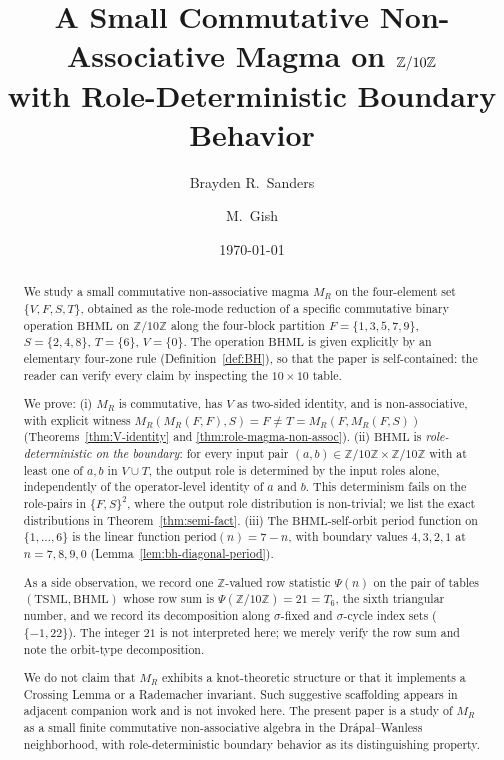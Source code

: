 \documentclass[11pt,reqno]{amsart}
\title[A small role-deterministic magma on $\Zten$]
{A Small Commutative Non-Associative Magma on $\Zten$\\
 with Role-Deterministic Boundary Behavior}
\author{Brayden R.\ Sanders}
\author{M.\ Gish}
\date{\today}
\theoremstyle{plain}
\theoremstyle{definition}
\theoremstyle{remark}
\newcommand{\Z}{\mathbb{Z}}
\newcommand{\TS}{\mathrm{TSML}}
\newcommand{\BH}{\mathrm{BHML}}
\newcommand{\sig}{\sigma}
\newcommand{\Zten}{\Z/10\Z}
\begin{document}
\begin{abstract}
We study a small commutative non-associative magma $M_R$ on the
four-element set $\{V, F, S, T\}$, obtained as the role-mode
reduction of a specific commutative binary operation $\BH$ on
$\Zten$ along the four-block partition
$F = \{1, 3, 5, 7, 9\}$, $S = \{2, 4, 8\}$, $T = \{6\}$,
$V = \{0\}$. The operation $\BH$ is given explicitly by an
elementary four-zone rule (Definition~\ref{def:BH}), so that the
paper is self-contained: the reader can verify every claim by
inspecting the $10 \times 10$ table.

We prove: (i) $M_R$ is commutative, has $V$ as two-sided identity,
and is non-associative, with explicit witness
$M_R(M_R(F, F), S) = F \neq T = M_R(F, M_R(F, S))$
(Theorems~\ref{thm:V-identity} and \ref{thm:role-magma-non-assoc}).
(ii) $\BH$ is \emph{role-deterministic on the boundary}: for every
input pair $(a, b) \in \Zten \times \Zten$ with at least one of
$a, b$ in $V \cup T$, the output role is determined by the input
roles alone, independently of the operator-level identity of $a$
and $b$. This determinism fails on the role-pairs in $\{F, S\}^2$,
where the output role distribution is non-trivial; we list the
exact distributions in Theorem~\ref{thm:semi-fact}. (iii) The
$\BH$-self-orbit period function on $\{1, \ldots, 6\}$ is the
linear function $\mathrm{period}(n) = 7 - n$, with boundary
values $4, 3, 2, 1$ at $n = 7, 8, 9, 0$
(Lemma~\ref{lem:bh-diagonal-period}).

As a side observation, we record one $\Z$-valued row statistic
$\Psi(n)$ on the pair of tables $(\TS, \BH)$ whose row sum is
$\Psi(\Zten) = 21 = T_6$, the sixth triangular number, and we
record its decomposition along $\sig$-fixed and $\sig$-cycle
index sets ($\{-1, 22\}$). The integer $21$ is not interpreted
here; we merely verify the row sum and note the orbit-type
decomposition.

We do not claim that $M_R$ exhibits a knot-theoretic structure
or that it implements a Crossing Lemma or a Rademacher invariant.
Such suggestive scaffolding appears in adjacent companion work
\cite{FourCore} and is not invoked here. The present paper is a
study of $M_R$ as a small finite commutative non-associative
algebra in the Dr\'apal--Wanless~\cite{DrapalWanless2021}
neighborhood, with role-deterministic boundary behavior as its
distinguishing property.
\end{abstract}

\maketitle
\end{document}
